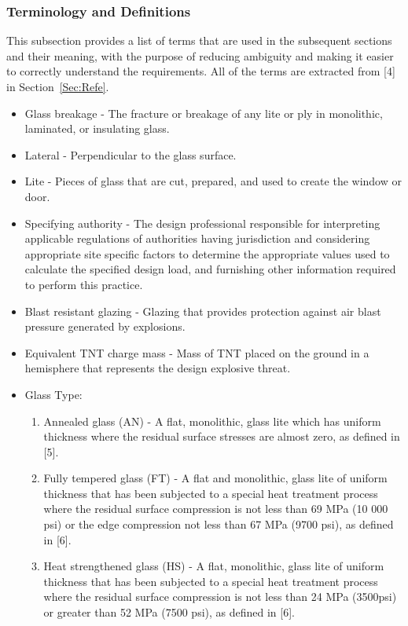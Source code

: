 \documentclass[12pt]{article}
\begin{document}
\subsubsection{Terminology and Definitions}
\label{Sec:TermandDefi}
This subsection provides a list of terms that are used in the subsequent sections and their meaning, with the purpose of reducing ambiguity and making it easier to correctly understand the requirements. All of the terms are extracted from {[}4{]} in Section~\ref{Sec:Refe}.
\begin{itemize}
\item{Glass breakage - The fracture or breakage of any lite or ply in monolithic, laminated, or insulating glass.}
\item{Lateral - Perpendicular to the glass surface.}
\item{Lite - Pieces of glass that are cut, prepared, and used to create the window or door.}
\item{Specifying authority - The design professional responsible for interpreting applicable regulations of authorities having jurisdiction and considering appropriate site specific factors to determine the appropriate values used to calculate the specified design load, and furnishing other information required to perform this practice.}
\item{Blast resistant glazing - Glazing that provides protection against air blast pressure generated by explosions.}
\item{Equivalent TNT charge mass - Mass of TNT placed on the ground in a hemisphere that represents the design explosive threat.}
\item{Glass Type:}
\begin{enumerate}
\item{Annealed glass (AN) - A flat, monolithic, glass lite which has uniform thickness where the residual surface stresses are almost zero, as defined in [5].}
\item{Fully tempered glass (FT) - A flat and monolithic, glass lite of uniform thickness that has been subjected to a special heat treatment process where the residual surface compression is not less than 69 MPa (10 000 psi) or the edge compression not less than 67 MPa (9700 psi), as defined in [6].}
\item{Heat strengthened glass (HS) - A flat, monolithic, glass lite of uniform thickness that has been subjected to a special heat treatment process where the residual surface compression is not less than 24 MPa (3500psi) or greater than 52 MPa (7500 psi), as defined in [6].}

\end{enumerate}
\end{itemize}
\end{document}
